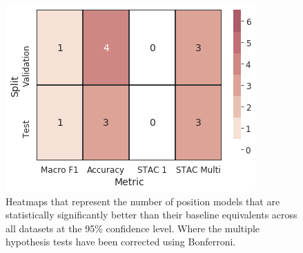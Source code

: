 \begin{figure}[h!]
    \centering
    \includegraphics[scale=0.6]{images/augmentation/methods_performance/Position_Encoding/position_corrected_overall_sig_models.png}
    \caption{Heatmaps that represent the number of position models that are statistically significantly better than their baseline equivalents across all datasets at the 95\% confidence level. Where the multiple hypothesis tests have been corrected using Bonferroni.}
    \label{fig:aug_position_corrected_overall_sig_models}
\end{figure}

